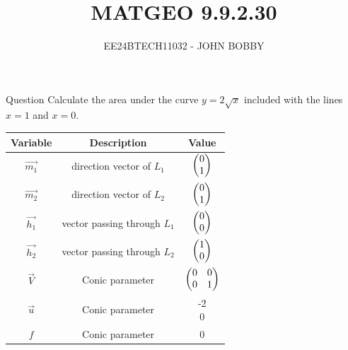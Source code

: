 \documentclass{beamer}
\begin{document}
\title{MATGEO 9.9.2.30}
\author{EE24BTECH11032 - JOHN BOBBY}
\date{}
\frame{\titlepage}
\begin{frame}{Question}
    Calculate the area under the curve $y=2\sqrt{x}$ included with the lines $x=1$ and $x=0$.\\
\end{frame}
\begin{frame}{}
\begin{table}[]
    \centering
    \begin{tabular}{|c|c|c|}
    \hline
	\textbf{Variable} & \textbf{Description} & \textbf{Value}\\ 
    \hline
	$\vec{m_1}$ & direction vector of $L_1$ & $\begin{pmatrix}0\\1\end{pmatrix}$ \\
    \hline
	$\vec{m_2}$ & direction vector of $L_2$ & $\begin{pmatrix}0\\1\end{pmatrix}$\\
    \hline
	$\vec{h_1}$ &  vector passing through $L_1$ & $\begin{pmatrix}0\\0\end{pmatrix}$ \\
    \hline
	$\vec{h_2}$ &  vector passing through $L_2$ & $\begin{pmatrix}1\\0\end{pmatrix}$ \\
    \hline
	$\vec{V}$ &  Conic parameter & $\begin{pmatrix}0 & 0\\0 & 1\end{pmatrix}$\\
    \hline
	$\vec{u}$ & Conic parameter & \myvec{-2 \\0}\\
    \hline
	$f$ & Conic parameter & $0$\\
    \hline
    \end{tabular}
\end{table}
\end{frame}
\end{document}
